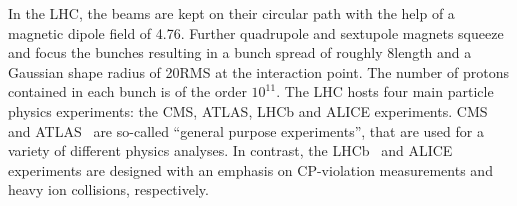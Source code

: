 In the LHC, the beams are kept on their circular path with the help of a magnetic dipole field of 4.76\tesla.
Further quadrupole and sextupole magnets squeeze and focus the bunches resulting in a bunch spread of roughly 8\cm length and a Gaussian shape radius of 20\mum RMS at the interaction point.
The number of protons contained in each bunch is of the order $10^{11}$.
The LHC hosts four main particle physics experiments: the CMS, ATLAS, LHCb and ALICE experiments.
CMS~\cite{bib:CMS:experiment,bib:CMS:TDR} and ATLAS~\cite{bib:ATLAS:experiment,bib:ATLAS:TDR_1,bib:ATLAS:TDR_2} are so-called ``general purpose experiments'', that are used for a variety of different physics analyses.
In contrast, the LHCb~\cite{bib:LHCb:experiment} and ALICE~\cite{bib:ALICE:experiment} experiments are designed with an emphasis on CP-violation measurements and heavy ion collisions, respectively.

